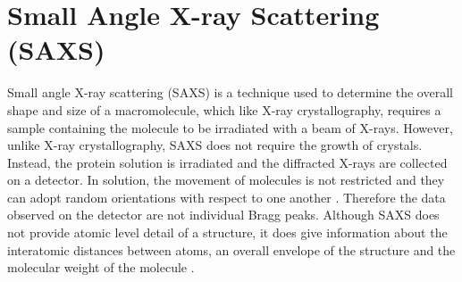 \section{Small Angle X-ray Scattering (SAXS)}
\label{sec:Small Angle X-ray Scattering}
    Small angle X-ray scattering (SAXS) is a technique used to determine the overall shape and size of a macromolecule, which like X-ray crystallography, requires a sample containing the molecule to be irradiated with a beam of X-rays.
    However, unlike X-ray crystallography, SAXS does not require the growth of crystals.
    Instead, the protein solution is irradiated and the diffracted X-rays are collected on a detector.
    In solution, the movement of molecules is not restricted and they can adopt random orientations with respect to one another \cite{blanchet2013small}.
    Therefore the data observed on the detector are not individual Bragg peaks.
    Although SAXS does not provide atomic level detail of a structure, it does give information about the interatomic distances between atoms, an overall envelope of the structure and the molecular weight of the molecule \cite{pollack2011saxs}.

